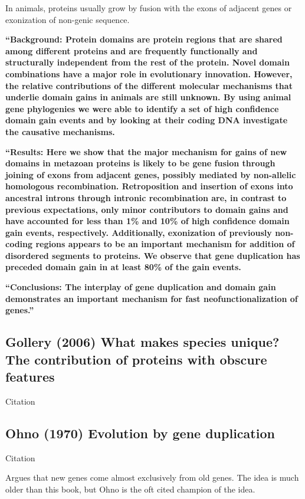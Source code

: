     In animals, proteins usually grow by fusion with the exons of adjacent
    genes or exonization of non-genic sequence.

    \textbf{``Background: Protein domains are protein regions that are shared
        among different proteins and are frequently functionally and
        structurally independent from the rest of the protein. Novel domain
        combinations have a major role in evolutionary innovation. However, the
        relative contributions of the different molecular mechanisms that
        underlie domain gains in animals are still unknown. By using animal
        gene phylogenies we were able to identify a set of high confidence
        domain gain events and by looking at their coding DNA investigate the
        causative mechanisms.}

    \textbf{``Results: Here we show that the major mechanism for gains of new
        domains in metazoan proteins is likely to be gene fusion through
        joining of exons from adjacent genes, possibly mediated by non-allelic
        homologous recombination.  Retroposition and insertion of exons into
        ancestral introns through intronic recombination are, in contrast to
        previous expectations, only minor contributors to domain gains and have
        accounted for less than 1\% and 10\% of high confidence domain gain
        events, respectively.  Additionally, exonization of previously
        non-coding regions appears to be an important mechanism for addition of
        disordered segments to proteins. We observe that gene duplication has
        preceded domain gain in at least 80\% of the gain events.}

    \textbf{``Conclusions: The interplay of gene duplication and domain gain
        demonstrates an important mechanism for fast neofunctionalization of
        genes.''}


    
\subsection{Gollery (2006) What makes species unique? The contribution of
proteins with obscure features}

    Citation \cite{gollery_what_2006}

\subsection{Ohno (1970) Evolution by gene duplication}

    Citation \cite{ohno_evolution_1970}

    Argues that new genes come almost exclusively from old genes. The idea
    is much older than this book, but Ohno is the oft cited champion of the
    idea.
